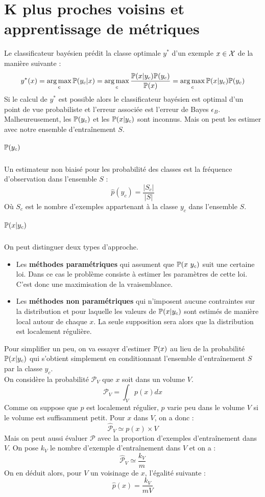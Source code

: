 \chapter{K plus proches voisins et apprentissage de métriques}

\myminitoc


Le classificateur bayésien prédit la classe optimale $y^*$ d'un exemple $x \in \mathcal{X}$ de la manière suivante :
$$ y^*(x) = \operatorname*{arg\,max}_c \mathbb{P}(y_c | x) = \operatorname*{arg\,max}_c \dfrac{\mathbb{P}(x | y_c) \mathbb{P}(y_c)}{\mathbb{P}(x)} = \operatorname*{arg\,max}_c \mathbb{P}(x | y_c) \mathbb{P}(y_c) $$
Si le calcul de $y^*$ est possible alors le classificateur bayésien est optimal d'un point de vue probabiliste et l'erreur associée est l'erreur de Bayes $\epsilon_B$. \\
Malheureusement, les $\mathbb{P}(y_c)$ et les $\mathbb{P}(x | y_c)$ sont inconnus. Mais on peut les estimer avec notre ensemble d'entraînement $S$.

\paragraph{\boldmath $\mathbb{P}(y_c)$}
Un estimateur non biaisé pour les probabilité des classes est la fréquence d'observation dans l'ensemble $S$ :
$$ \hat{p}(y_c) = \dfrac{|S_c|}{|S|} $$
Où $S_c$ est le nombre d'exemples appartenant à la classe $y_c$ dans l'ensemble $S$.

\paragraph{\boldmath $\mathbb{P}(x | y_c)$}
On peut distinguer deux types d'approche.
\begin{itemize}
	\item Les \textbf{méthodes paramétriques} qui assument que $\mathbb{P}(x \ y_c)$ suit une certaine loi. Dans ce cas le problème consiste à estimer les paramètres de cette loi. C'est donc une maximisation de la vraisemblance.
	\item Les \textbf{méthodes non paramétriques} qui n'imposent aucune contraintes sur la distribution et pour laquelle les valeurs de $\mathbb{P}(x | y_c)$ sont estimés de manière local autour de chaque $x$. La seule supposition sera alors que la distribution est localement régulière.
\end{itemize}

Pour simplifier un peu, on va essayer d'estimer $\mathbb{P}(x)$ au lieu de la probabilité $\mathbb{P}(x | y_c)$ qui s'obtient simplement en conditionnant l'ensemble d'entraînement $S$ par la classe $y_c$. \\
On considère la probabilité $\mathcal{P}_V$ que $x$ soit dans un volume $V$.
$$ \mathcal{P}_V = \int_V p(x)dx $$
Comme on suppose que $p$ est localement régulier, $p$ varie peu dans le volume $V$ si le volume est suffisamment petit. Pour $x$ dans $V$, on a donc :
$$ \hat{\mathcal{P}}_V \simeq p(x) \times V $$
Mais on peut aussi évaluer $\mathcal{P}$ avec la proportion d'exemples d'entraînement dans $V$. On pose $k_V$ le nombre d'exemple d'entraînement dans $V$ et on a :
$$ \hat{\mathcal{P}}_V \simeq \dfrac{k_V}{m} $$
On en déduit alors, pour $V$ un voisinage de $x$, l'égalité suivante :
$$ \hat{p}(x) = \dfrac{k_V}{m V} $$

